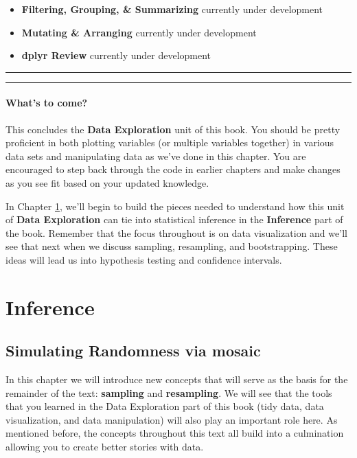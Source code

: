 \documentclass[]{tufte-book}
\let\oldrule=\rule
\renewcommand{\rule}[1]{\oldrule{\linewidth}}
\begin{document}
\begin{itemize}
\item
  \textbf{Filtering, Grouping, \& Summarizing} currently under
  development
\item
  \textbf{Mutating \& Arranging} currently under development
\item
  \textbf{dplyr Review} currently under development
\end{itemize}

\begin{center}\rule{0.5\linewidth}{\linethickness}\end{center}

\begin{center}\rule{0.5\linewidth}{\linethickness}\end{center}

\subsection{What's to come?}\label{whats-to-come-2}

This concludes the \textbf{Data Exploration} unit of this book. You
should be pretty proficient in both plotting variables (or multiple
variables together) in various data sets and manipulating data as we've
done in this chapter. You are encouraged to step back through the code
in earlier chapters and make changes as you see fit based on your
updated knowledge.

In Chapter \ref{sim}, we'll begin to build the pieces needed to
understand how this unit of \textbf{Data Exploration} can tie into
statistical inference in the \textbf{Inference} part of the book.
Remember that the focus throughout is on data visualization and we'll
see that next when we discuss sampling, resampling, and bootstrapping.
These ideas will lead us into hypothesis testing and confidence
intervals.

\part{Inference}\label{part-inference}

\chapter{Simulating Randomness via mosaic}\label{sim}

In this chapter we will introduce new concepts that will serve as the
basis for the remainder of the text: \textbf{sampling} and
\textbf{resampling}. We will see that the tools that you learned in the
Data Exploration part of this book (tidy data, data visualization, and
data manipulation) will also play an important role here. As mentioned
before, the concepts throughout this text all build into a culmination
allowing you to create better stories with data.
\end{document}
